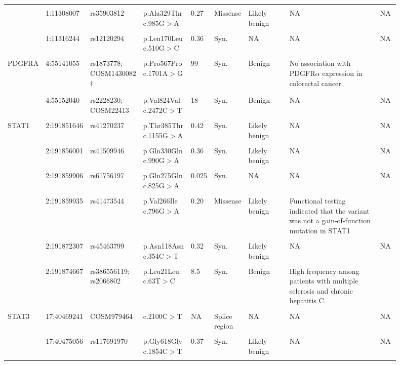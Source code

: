 \begin{landscape}
\begin{longtable}{p{0.07\linewidth}|p{0.09\linewidth}p{0.11\linewidth}p{0.1\linewidth}p{0.05\linewidth}p{0.065\linewidth}p{0.11\linewidth}p{0.25\linewidth}p{0.05\linewidth}}
		\\
		\\
		& 1:11308007 & rs35903812 & p.Ala329Thr c.985G$>$A & 0.27 & Missense & Likely benign & NA & NA
		\\
		\\
		& 1:11316244 & rs12120294 & p.Leu170Leu c.510G$>$C & 0.36 & Syn. & NA & NA & NA
		\\
		\\
		\hline
		PDGFRA & 4:55141055 & rs1873778; COSM1430082\textsuperscript{$\ddagger$} & p.Pro567Pro c.1701A$>$G & 99 & Syn. & Benign & No association with PDGFR$\alpha$ \mbox{expression} in colorectal cancer. & \cite{Estevez-Garcia2012}
		\\
		\\
		& 4:55152040 & rs2228230; COSM22413 & p.Val824Val c.2472C$>$T & 18 & Syn. & Benign & NA & NA
		\\
		\\
		\hline
		STAT1 & 2:191851646 & rs41270237 & p.Thr385Thr c.1155G$>$A & 0.42 & Syn. & Likely benign & NA & NA
		\\
		\\
		& 2:191856001 & rs41509946 & p.Gln330Gln c.990G$>$A & 0.36 & Syn. & Likely benign & NA & NA
		\\
		\\
		& 2:191859906 & rs61756197 & p.Gln275Gln c.825G$>$A & 0.025 & Syn. & NA & NA & NA
		\\
		\\
		& 2:191859935 & rs41473544 & p.Val266Ile c.796G$>$A & 0.20 & Missense & Likely benign & Functional testing indicated that the variant was not a gain-of-function mutation in STAT1 & \cite{Depner2016}
		\\
		\\
		& 2:191872307 & rs45463799 & p.Asn118Asn c.354C$>$T & 0.32 & Syn. & Likely benign & NA & NA
		\\
		\\
		& 2:191874667 & rs386556119; rs2066802 & p.Leu21Leu c.63T$>$C & 8.5 & Syn. & Benign & High frequency among patients with multiple sclerosis and chronic hepatitis C. & \cite{Fortunato2008}
		\\
		\\
		\hline
		STAT3 & 17:40469241 & COSM979464 & c.2100C$>$T & NA & Splice region & NA & NA & NA
		\\
		\\
		& 17:40475056 & rs117691970 & p.Gly618Gly c.1854C$>$T & 0.37 & Syn. & Likely benign & NA & NA
		\\
		\\

\end{longtable}
\end{landscape}
